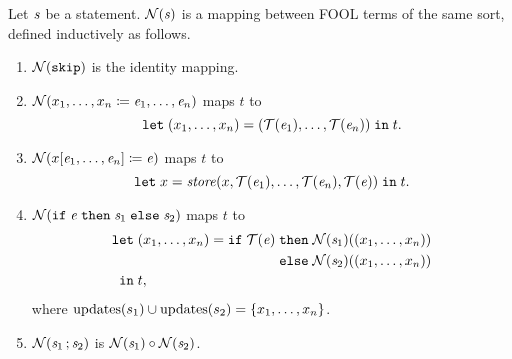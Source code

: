 \begin{definition}\label{def:boogie/encoding}
Let $\mathit{s}$ be a statement. $\mathcal{N}({\mathit{s}})$ is a mapping between FOOL terms of the same sort, defined inductively as follows.
\begin{enumerate}
  \item $\mathcal{N}({\mathtt{skip}})$ is the identity mapping.
  \item $\mathcal{N}({{x_1,\ldots,x_n}\coloneqq{\mathit{e}_1,\ldots,\mathit{e}_n}})$ maps $t$ to $$\mathtt{let}\;{(x_1,\ldots,x_n)}={(\mathcal{T}({\mathit{e}_1}),\ldots,\mathcal{T}({\mathit{e}_n}))}\;\allowbreak\mathtt{in}\;{t}.$$
  \item $\mathcal{N}({{x[\mathit{e}_1,\ldots,\mathit{e}_n]}\coloneqq{\mathit{e}}})$ maps $t$ to $$\mathtt{let}\;{x}={\mathit{store}(x,\mathcal{T}({\mathit{e}_1}),\ldots,\mathcal{T}({\mathit{e}_n}),\mathcal{T}({\mathit{e}}))}\;\allowbreak\mathtt{in}\;{t}.$$
  \item $\mathcal{N}({\mathtt{if}\;{\mathit{e}}\;\allowbreak\mathtt{then}\;{\mathit{s}_1}\;\allowbreak\mathtt{else}\;{\mathit{s}_2}})$ maps $t$ to \[
    \letnl{(x_1,\ldots,x_n)}{\itenl{\translate{\expr}}
                                   {\tuplify{\stmt_1}{(x_1,\ldots,x_n)}}
                                   {\tuplify{\stmt_2}{(x_1,\ldots,x_n)}}}
          {t,}
  \] where $\mathrm{updates}({s_1})\cup\mathrm{updates}({s_2}) = \{x_1,\ldots,x_n\}$.\\[-0.5em]
  \item $\mathcal{N}({{\mathit{s}_1}\,;{\mathit{s}_2}})$ is $\mathcal{N}({\mathit{s}_1})\circ\mathcal{N}({\mathit{s}_2})$. \QED
\end{enumerate}
\end{definition}

